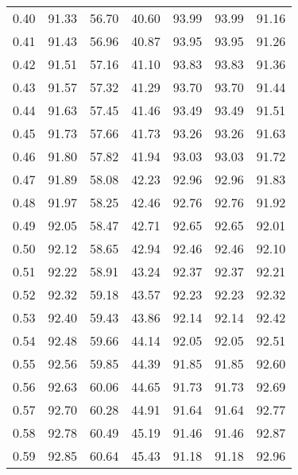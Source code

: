 \begin{tabular}{|c|c|c|c|c|c|c|}
      0.40 &     91.33 &     56.70 &      40.60 &   93.99 &      93.99 &         91.16 \\
      0.41 &     91.43 &     56.96 &      40.87 &   93.95 &      93.95 &         91.26 \\
      0.42 &     91.51 &     57.16 &      41.10 &   93.83 &      93.83 &         91.36 \\
      0.43 &     91.57 &     57.32 &      41.29 &   93.70 &      93.70 &         91.44 \\
      0.44 &     91.63 &     57.45 &      41.46 &   93.49 &      93.49 &         91.51 \\
      0.45 &     91.73 &     57.66 &      41.73 &   93.26 &      93.26 &         91.63 \\
      0.46 &     91.80 &     57.82 &      41.94 &   93.03 &      93.03 &         91.72 \\
      0.47 &     91.89 &     58.08 &      42.23 &   92.96 &      92.96 &         91.83 \\
      0.48 &     91.97 &     58.25 &      42.46 &   92.76 &      92.76 &         91.92 \\
      0.49 &     92.05 &     58.47 &      42.71 &   92.65 &      92.65 &         92.01 \\
      0.50 &     92.12 &     58.65 &      42.94 &   92.46 &      92.46 &         92.10 \\
      0.51 &     92.22 &     58.91 &      43.24 &   92.37 &      92.37 &         92.21 \\
      0.52 &     92.32 &     59.18 &      43.57 &   92.23 &      92.23 &         92.32 \\
      0.53 &     92.40 &     59.43 &      43.86 &   92.14 &      92.14 &         92.42 \\
      0.54 &     92.48 &     59.66 &      44.14 &   92.05 &      92.05 &         92.51 \\
      0.55 &     92.56 &     59.85 &      44.39 &   91.85 &      91.85 &         92.60 \\
      0.56 &     92.63 &     60.06 &      44.65 &   91.73 &      91.73 &         92.69 \\
      0.57 &     92.70 &     60.28 &      44.91 &   91.64 &      91.64 &         92.77 \\
      0.58 &     92.78 &     60.49 &      45.19 &   91.46 &      91.46 &         92.87 \\
      0.59 &     92.85 &     60.64 &      45.43 &   91.18 &      91.18 &         92.96 \\

\end{tabular}
